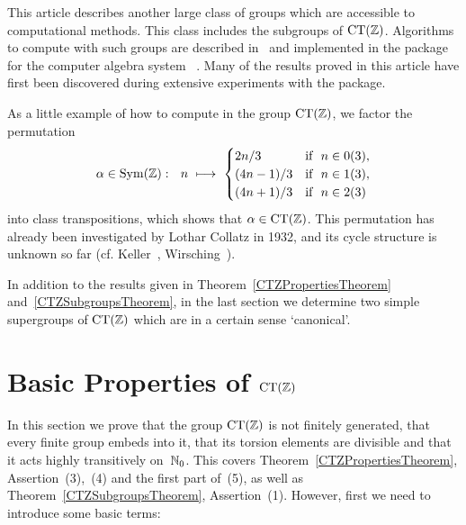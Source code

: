 \documentclass{amsart}
\theoremstyle{definition} \newtheorem{CTZDefinition}{Definition}[section]
\theoremstyle{plain}      \newtheorem{CTZPropertiesTheorem}[CTZDefinition]{Theorem}
\theoremstyle{plain}      \newtheorem{CTZSubgroupsTheorem}[CTZDefinition]{Theorem}
\theoremstyle{definition} \newtheorem{RcwaMappingDefinition}{Definition}[section]
\theoremstyle{definition} \newtheorem{RCWADefinition}[RcwaMappingDefinition]{Definition}
\theoremstyle{plain}      \newtheorem{CTZNotFinitelyGeneratedTheorem}
\theoremstyle{definition} \newtheorem{CTZSmEmbeddingDefinition}[RcwaMappingDefinition]{Definition}
\theoremstyle{plain}      \newtheorem{CTZHighlyTransitiveTheorem}[RcwaMappingDefinition]{Theorem}
\theoremstyle{plain}      \newtheorem{CTZTorsionElementsDivisibleTheorem}
\theoremstyle{plain}      \newtheorem{CTLemma}{Lemma}[section]
\theoremstyle{plain}      \newtheorem{IntegralCommutatorLemma}[CTLemma]{Lemma}
\theoremstyle{plain}      \newtheorem{NormalSubgroupContainsIntegralElementLemma}[CTLemma]{Lemma}
\theoremstyle{plain}      \newtheorem{CTZSimpleTheorem}[CTLemma]{Theorem}
\theoremstyle{remark}     \newtheorem{CTZSimpleRemark}[CTLemma]{Remark}
\theoremstyle{definition} \newtheorem{CTPZDefinition}[CTLemma]{Definition}
\theoremstyle{plain}      \newtheorem{CTPZSimpleCorollary}[CTLemma]{Corollary}
\theoremstyle{plain}      \newtheorem{CTPZSimpleProblem}[CTLemma]{Problem}
\theoremstyle{plain}      \newtheorem{FnPSL2ZEmbeddingTheorem}{Theorem}[section]
\theoremstyle{plain}      \newtheorem{FreeProductEmbeddingTheorem}[FnPSL2ZEmbeddingTheorem]{Theorem}
\theoremstyle{definition} \newtheorem{RestrictionMonomorphismDefinition}
\theoremstyle{plain}      \newtheorem{DirectAndWreathProductsEmbeddingTheorem}
\theoremstyle{plain}      \newtheorem{DirectAndWreathProductsEmbeddingCorollary}
\theoremstyle{definition} \newtheorem{CTintZDefinition}[FnPSL2ZEmbeddingTheorem]{Definition}
\theoremstyle{plain}      \newtheorem{CTintZSimpleTheorem}[FnPSL2ZEmbeddingTheorem]{Theorem}
\theoremstyle{definition} \newtheorem{KernelDefinition}{Definition}[section]
\theoremstyle{definition} \newtheorem{TameWildDefinition}[KernelDefinition]{Definition}
\theoremstyle{definition} \newtheorem{SimpleSupergroupsDefinition}[KernelDefinition]{Definition}
\theoremstyle{definition} \newtheorem{CSCRDefinition}[KernelDefinition]{Definition}
\theoremstyle{plain}      \newtheorem{SimpleSupergroupsGeneratorsTheorem}[KernelDefinition]{Theorem}
\theoremstyle{plain}      \newtheorem{SimpleSupergroupsTheorem}[KernelDefinition]{Theorem}
\theoremstyle{plain}      \newtheorem{SimpleSupergroupsTransitivityTheorem}
\theoremstyle{plain}      \newtheorem{TameGenerationConjecture}[KernelDefinition]{Conjecture}
\theoremstyle{remark}     \newtheorem{TameGenerationRemark}[KernelDefinition]{Remark}
\begin{document}
This article describes another large class of groups which are accessi\-ble to computational
methods. This class includes the subgroups of \(\CT{\ZZ}\). Algorithms to compute with such
groups are described in~\cite{Kohl07b} and implemented in the package \RCWAPackage~\cite{Kohl05a}
for the computer algebra system \GAP~\cite{GAP4}. Many of the results proved in this article
have first been discovered during extensive experiments with the \RCWAPackage package.

As a little example of how to compute in the group \(\CT{\ZZ}\), we factor the permutation
\[
  \alpha \in \SYM{\ZZ}: \ \ n \ \longmapsto \
  \begin{cases}
    2n/3       & \text{if} \ \ n \in 0(3), \\
    (4n - 1)/3 & \text{if} \ \ n \in 1(3), \\
    (4n + 1)/3 & \text{if} \ \ n \in 2(3)
  \end{cases}
\]
into class transpositions, which shows that \(\alpha \in \CT{\ZZ}\). This permutation has
already been investigated by Lothar Collatz in 1932, and its cycle structure is unknown so far
(cf. Keller~\cite{Keller99}, Wirsching~\cite{Wirsching96}).

In addition to the results given in Theorem~\ref{CTZPropertiesTheorem}
and~\ref{CTZSubgroupsTheorem}, in the last section we determine two simple supergroups
of \(\CT{\ZZ}\) which are in a certain sense `canonical'.

\section{Basic Properties of \(\CT{\ZZ}\)} \label{BasicPropertiesSection}

In this section we prove that the group \(\CT{\ZZ}\) is not finitely generated, that every
finite group embeds into it, that its torsion elements are divisible and that it acts
highly transitively on~\(\mathbb{N}_0\). This covers Theorem~\ref{CTZPropertiesTheorem},
\mbox{Assertion (3), (4)} and the first part of~(5), as well as Theorem~\ref{CTZSubgroupsTheorem},
Assertion~(1). However, first we need to introduce some basic terms:
\end{document}
